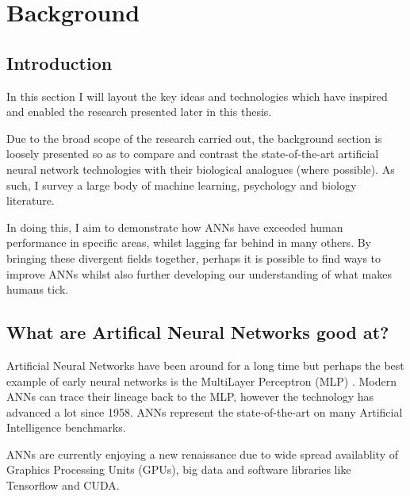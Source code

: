 
\chapter{Background} %

\label{Chapter2} %



\section{Introduction}\label{Lit:Intro}
In this section I will layout the key ideas and technologies which have inspired and enabled the research presented later in this thesis.

Due to the broad scope of the research carried out, the background section is loosely presented so as to compare and contrast the state-of-the-art artificial neural network technologies with their biological analogues (where possible). As such, I survey a large body of machine learning, psychology and biology literature.

In doing this, I aim to demonstrate how ANNs have exceeded human performance in specific areas, whilst lagging far behind in many others. By bringing these divergent fields together, perhaps it is possible to find ways to improve ANNs whilst also further developing our understanding of what makes humans tick. 


\section{What are Artifical Neural Networks good at?}
Artificial Neural Networks have been around for a long time but perhaps the best example of early neural networks is the MultiLayer Perceptron (MLP) \cite{rosenblatt1958perceptron}. Modern ANNs can trace their lineage back to the MLP, however the technology has advanced a lot since 1958. ANNs represent the state-of-the-art on many Artificial Intelligence benchmarks.

ANNs are currently enjoying a new renaissance due to wide spread availablity of Graphics Processing Units (GPUs), big data and software libraries like Tensorflow and CUDA.

